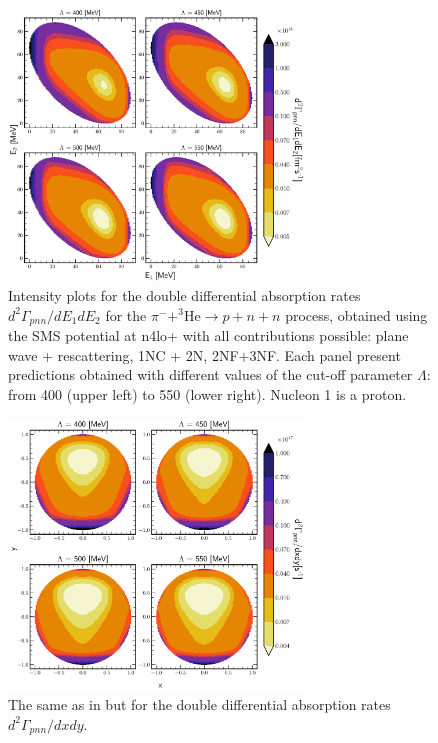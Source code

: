        \begin{figure}[h]
            \begin{center}
            \includegraphics[width=0.7\textwidth]{PlotData/PION/Dalitz_maps/figures/Dalitz_map_pnn_E1E2_cutofs.pdf}
            \end{center}
            \caption{Intensity plots for the double differential absorption rates
            $d^2 \Gamma_{pnn}/dE_1dE_2$ for the $\pi^- + ^3\text{He} \rightarrow p + n + n$
            process, obtained using the SMS potential at \gls{n4lo+}
            with all contributions possible: plane wave + rescattering, 1NC + 2N, 2NF+3NF.
            Each panel present predictions obtained with different values of the cut-off parameter $\Lambda$:
            from \SI{400}{\mev} (upper left) to \SI{550}{\mev} (lower right). Nucleon 1 is a proton.}
            \label{pion_map_E1E2_cutoff}
        \end{figure}

    \begin{figure}[h]
        \begin{center}
        \includegraphics[width=0.7\textwidth]{PlotData/PION/Dalitz_maps/figures/Dalitz_map_pnn_xy_cutofs.pdf}
        \end{center}
        \caption{The same as in  but for the double differential absorption rates
        $d^2 \Gamma_{pnn}/dxdy$.}
        \label{pion_map_xy_cutoff}
    \end{figure}

